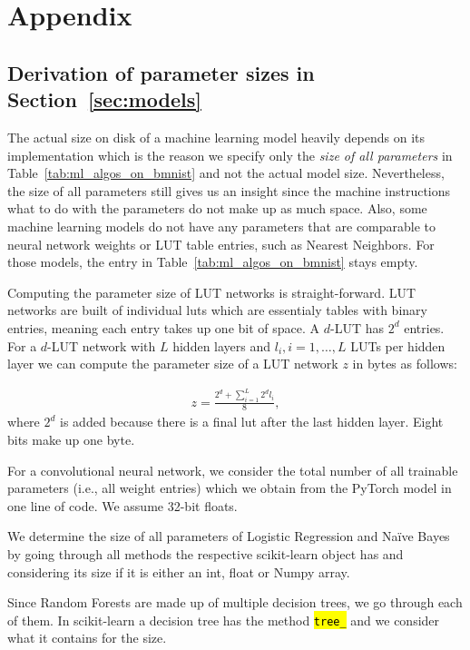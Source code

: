 \appendix

\section{Appendix}

\subsection{Derivation of parameter sizes in Section~\ref{sec:models}} \label{app:size}
The actual size on disk of a machine learning model heavily depends on its implementation which is the reason we specify only the \textit{size of all parameters} in Table~\ref{tab:ml_algos_on_bmnist} and not the actual model size. Nevertheless, the size of all parameters still gives us an insight since the machine instructions what to do with the parameters do not make up as much space. Also, some machine learning models do not have any parameters that are comparable to neural network weights or LUT table entries, such as Nearest Neighbors. For those models, the entry in Table~\ref{tab:ml_algos_on_bmnist} stays empty.

Computing the parameter size of LUT networks is straight-forward. LUT networks are built of individual luts which are essentialy tables with binary entries, meaning each entry takes up one bit of space. A $d$-LUT has $2^d$ entries. For a $d$-LUT network with $L$ hidden layers and $l_i, i=1, \dots, L$ LUTs per hidden layer we can compute the parameter size of a LUT network $z$ in bytes as follows:

\begin{align}
  z = \frac{2^d + \sum\limits_{i=1}^L 2^d l_i}{8},
\end{align}where $2^d$ is added because there is a final lut after the last hidden layer. Eight bits make up one byte.

For a convolutional neural network, we consider the total number of all trainable parameters (i.e., all weight entries) which we obtain from the PyTorch model in one line of code. We assume 32-bit floats.

We determine the size of all parameters of Logistic Regression and Naïve Bayes by going through all methods the respective scikit-learn object has and considering its size if it is either an int, float or Numpy array.

Since Random Forests are made up of multiple decision trees, we go through each of them. In scikit-learn a decision tree has the method \hl{\texttt{tree\_}} and we consider what it contains for the size.
